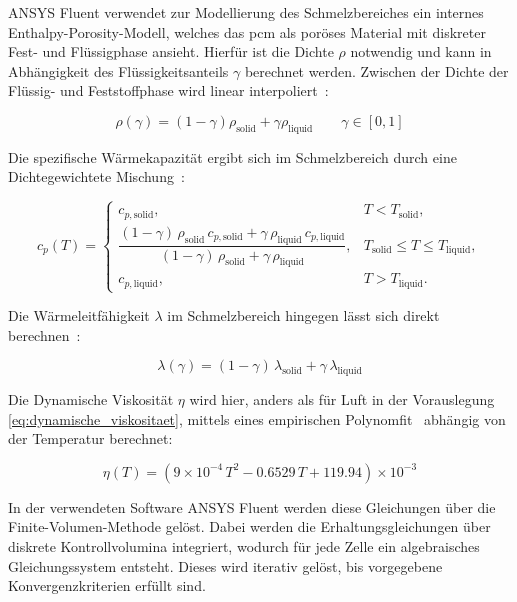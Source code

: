 ANSYS Fluent verwendet zur Modellierung des Schmelzbereiches ein internes \allowbreak Enthalpy-Porosity-Modell, welches das \ac{pcm} als poröses Material
mit diskreter Fest- und Flüssigphase ansieht. Hierfür ist die Dichte $\rho$ notwendig und kann in Abhängigkeit des Flüssigkeitsanteils $\gamma$ berechnet werden.
Zwischen der Dichte der Flüssig- und Feststoffphase wird linear interpoliert~\cite{akamcae-udf}:

\begin{equation}
  \label{eq:udf_dichte}
  \rho(\gamma) = \left(1- \gamma\right) \rho_\text{solid} + \gamma \rho_\text{liquid} \qquad \gamma \in [0,1]
\end{equation}

Die spezifische Wärmekapazität ergibt sich im Schmelzbereich durch eine Dichtegewichtete Mischung~\cite{akamcae-udf}:

\begin{equation}
  \label{eq:udf_cp}
    c_p(T)=
  \begin{cases}
    c_{p,\mathrm{solid}}, & T < T_\mathrm{solid},\\[6pt]
    \dfrac{(1-\gamma)\,\rho_\mathrm{solid}\,c_{p,\mathrm{solid}} + \gamma\,\rho_\mathrm{liquid}\,c_{p,\mathrm{liquid}}}
          {(1-\gamma)\,\rho_\mathrm{solid} + \gamma\,\rho_\mathrm{liquid}}, & T_\mathrm{solid} \le T \le T_\mathrm{liquid},\\[12pt]
    c_{p,\mathrm{liquid}}, & T > T_\mathrm{liquid}.
  \end{cases}
\end{equation}

Die Wärmeleitfähigkeit $\lambda$ im Schmelzbereich hingegen lässt sich direkt berechnen~\cite{akamcae-udf}:

\begin{equation}
  \label{eq:udf_lambda}
  \lambda(\gamma)= (1-\gamma)\,\lambda_{\mathrm{solid}} + \gamma\,\lambda_{\mathrm{liquid}}
\end{equation}

Die Dynamische Viskosität $\eta$ wird hier, anders als für Luft in der Vorauslegung \ref{eq:dynamische_viskositaet}, mittels eines empirischen
Polynomfit~\cite{akamcae-udf} abhängig von der Temperatur berechnet:

\begin{equation}
  \label{eq:udf_mu}
  \eta(T)= \left(9\times 10^{-4}\,T^{2} - 0.6529\,T + 119.94\right)\times 10^{-3}
\end{equation}

In der verwendeten Software ANSYS Fluent werden diese Gleichungen über die Finite-Volumen-Methode gelöst. Dabei werden die Erhaltungsgleichungen
über diskrete Kontrollvolumina integriert, wodurch für jede Zelle ein algebraisches Gleichungssystem entsteht. Dieses
wird iterativ gelöst, bis vorgegebene Konvergenzkriterien erfüllt sind.